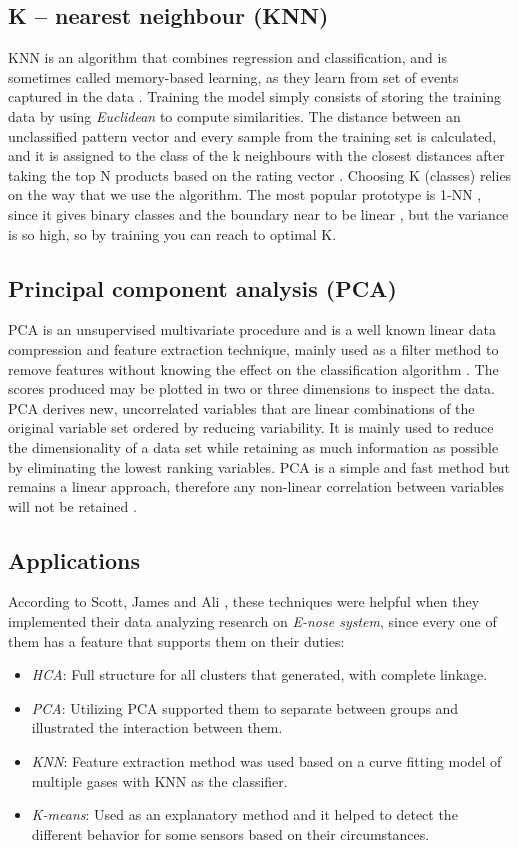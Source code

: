 \documentclass[letterpaper, 10 pt, conference]{ieeeconf}  %
\begin{document}
\subsection{K – nearest neighbour (KNN)}
KNN is an algorithm that combines regression and  classification, and is sometimes called memory-based learning, as they learn from set of events captured in the data \cite{Ramasubramanian2017}. Training the
model simply consists of storing the training data by using \textit{Euclidean} to compute similarities. The distance between an unclassified pattern vector and every sample from the training set is calculated, and it is assigned to the class of the k neighbours with the closest distances after taking the top N products based on the rating vector  \cite{Scott2006}\cite{Ramasubramanian2017}. Choosing K (classes) relies on the way that we use the algorithm. The most popular prototype is 1-NN  \cite{Scott2006}, since it gives binary classes and the boundary near to be linear \cite{Hastie2009}, but the variance is so high, so by training you can reach to optimal K. \subsection{Principal component analysis (PCA)} PCA is an unsupervised multivariate procedure and is a well known linear data compression and feature extraction technique, mainly used as a filter method to remove features without knowing the effect on the classification algorithm \cite{Hastie2009}. The scores produced may be plotted in two or three dimensions to inspect the data. PCA derives new, uncorrelated variables that are linear combinations of the original variable set ordered by reducing variability. It is mainly used to reduce the dimensionality of a data set while retaining as much information as possible by eliminating the lowest ranking variables. PCA is a simple and fast method but remains a linear approach, therefore any non-linear correlation between variables will not be retained \cite{Scott2006}.
\subsection{Applications}
According to Scott, James and Ali \cite{Scott2006}, these techniques were helpful when they implemented their data analyzing research on \textit{E-nose system}, since every one of them has a feature that supports them on their duties:

\begin{itemize}
	\item \textit{HCA}: Full structure for all clusters that generated, with complete linkage. 
	\item  \textit{PCA}: Utilizing PCA supported them to separate between groups and illustrated the interaction between them.
    \item \textit{KNN}: Feature extraction method was used based on a curve fitting model of multiple gases with KNN as the classifier.
    \item \textit{K-means}: Used as an explanatory method and it helped to detect the different behavior for some sensors based on their circumstances.
    \end{itemize}
    
\end{document}
